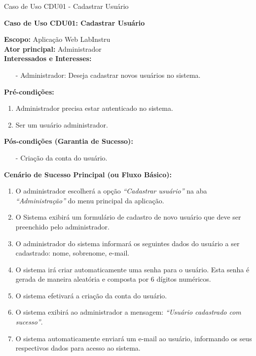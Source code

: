 \begin{quadro}[H]
	\centering
	\caption{Caso de Uso CDU01 - Cadastrar Usuário}

	\begin{framed}
		\textbf{Caso de Uso CDU01: Cadastrar Usuário}\\
		\begin{flushleft}
		\textbf{Escopo:} Aplicação Web LabInstru\\
		\textbf{Ator principal:} Administrador\\
		\textbf{Interessados e Interesses:}
		\begin{itemize}
			\item[-] Administrador: Deseja cadastrar novos usuários no sistema.
		\end{itemize}
		\textbf{Pré-condições:}\\
			 \begin{enumerate}
			 	\item{Administrador precisa estar autenticado no sistema.}
			 	\item{Ser um usuário administrador.}
			 \end{enumerate}
		\textbf{Pós-condições (Garantia de Sucesso):}
			\begin{itemize}
				\item[-] Criação da conta do usuário.
			\end{itemize}
		\textbf{Cenário de Sucesso Principal (ou Fluxo Básico):}\\
			\begin{enumerate}
			 	\item{O administrador escolherá a opção \textit{``Cadastrar usuário''} na aba \textit{``Administração''} do menu principal da aplicação.}
			 	\item{O Sistema exibirá um formulário de cadastro de novo usuário que deve ser preenchido pelo administrador.}
			 	\item O administrador do sistema informará os seguintes dados do usuário a ser cadastrado: nome, sobrenome, e-mail.
			 	\item{O sistema irá criar automaticamente uma senha para o usuário. Esta senha é gerada de maneira aleatória e composta por 6 dígitos numéricos.}
			 	\item{O sistema efetivará a criação da conta do usuário.}
			 	\item{O sistema exibirá ao administrador a mensagem: \textit{``Usuário cadastrado com sucesso''}.}
			 	\item{O sistema automaticamente enviará um e-mail ao usuário, informando os seus respectivos dados para acesso ao sistema.}
			 \end{enumerate}


\end{flushleft}
\end{framed}
\end{quadro}
